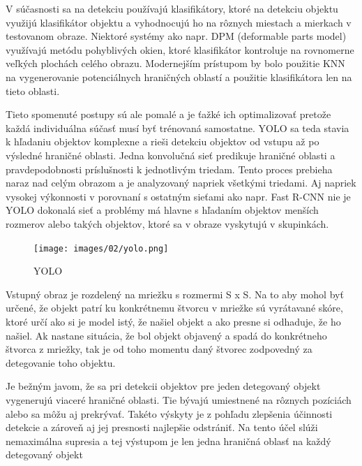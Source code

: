 V súčasnosti sa na detekciu používajú klasifikátory, ktoré na detekciu objektu využijú klasifikátor objektu a vyhodnocujú ho na rôznych miestach a mierkach v testovanom obraze. Niektoré systémy ako napr. DPM (deformable parts model) využívajú metódu pohyblivých okien, ktoré klasifikátor kontroluje na rovnomerne veľkých plochách celého obrazu.
Modernejším prístupom by bolo použitie KNN na vygenerovanie potenciálnych hraničných oblastí a použitie klasifikátora len na tieto oblasti.

Tieto spomenuté postupy sú ale pomalé a je ťažké ich optimalizovať pretože každá individuálna súčasť musí byť trénovaná samostatne. YOLO sa teda stavia k hľadaniu objektov komplexne a rieši detekciu objektov od vstupu až po výsledné hraničné oblasti. Jedna konvolučná sieť predikuje hraničné oblasti a pravdepodobnosti príslušnosti k jednotlivým triedam. Tento proces prebieha naraz nad celým obrazom a je analyzovaný napriek všetkými triedami. Aj napriek vysokej výkonnosti v porovnaní s ostatným sieťami ako napr. Fast R-CNN nie je YOLO dokonalá sieť a problémy má hlavne s hľadaním objektov menších rozmerov alebo takých objektov, ktoré sa v obraze vyskytujú v skupinkách.

\begin{figure}[ht]
    \centering
    \texttt{[image: images/02/yolo.png]}
    \caption{YOLO}
    \label{img:ch2}
\end{figure}

Vstupný obraz je rozdelený na mriežku s rozmermi S x S. Na to aby mohol byť určené, že objekt patrí ku konkrétnemu štvorcu v mriežke sú vyrátavané skóre, ktoré určí ako si je model istý, že našiel objekt a ako presne si odhaduje, že ho našiel. Ak nastane situácia, že bol objekt objavený a spadá do konkrétneho štvorca z mriežky, tak je od toho momentu daný štvorec zodpovedný za detegovanie toho objektu.

Je bežným javom, že sa pri detekcii objektov pre jeden detegovaný objekt vygenerujú viaceré hraničné oblasti. Tie bývajú umiestnené na rôznych pozíciách alebo sa môžu aj prekrývať. Takéto výskyty je z pohľadu zlepšenia účinnosti detekcie a zároveň aj jej presnosti najlepšie odstrániť. Na tento účel slúži nemaximálna supresia a tej výstupom je len jedna hraničná oblasť na každý detegovaný objekt


